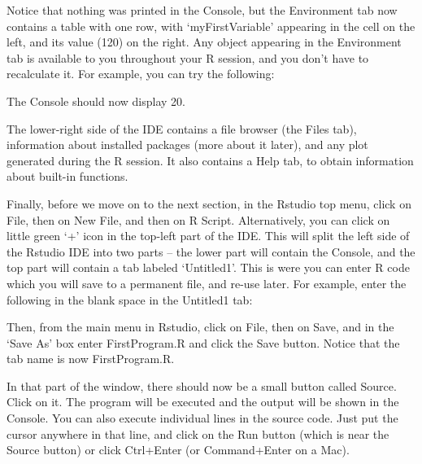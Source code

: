 Notice that nothing was printed in the Console, but the Environment tab now contains a table with one row, with `myFirstVariable' appearing in the cell on the left, and its value (120) on the right. Any object appearing in the Environment tab is available to you throughout your R session, and you don't have to recalculate it. For example, you can try the following:

\begin{Shaded}
\begin{Highlighting}[]
\SpecialCharTok{/}
\end{Highlighting}
\end{Shaded}

The Console should now display 20.

The lower-right side of the IDE contains a file browser (the Files tab), information about installed packages (more about it later), and any plot generated during the R session. It also contains a Help tab, to obtain information about built-in functions.

Finally, before we move on to the next section, in the Rstudio top menu, click on File, then on New File, and then on R Script. Alternatively, you can click on little green `+' icon in the top-left part of the IDE. This will split the left side of the Rstudio IDE into two parts -- the lower part will contain the Console, and the top part will contain a tab labeled `Untitled1'. This is were you can enter R code which you will save to a permanent file, and re-use later.
For example, enter the following in the blank space in the Untitled1 tab:

\begin{Shaded}
\begin{Highlighting}[]
\NormalTok{(}\StringTok{\textquotesingle{}}\NormalTok{)}
\end{Highlighting}
\end{Shaded}

Then, from the main menu in Rstudio, click on File, then on Save, and in the `Save As' box enter FirstProgram.R and click the Save button.
Notice that the tab name is now FirstProgram.R.

In that part of the window, there should now be a small button called Source. Click on it. The program will be executed and the output will be shown in the Console. You can also execute individual lines in the source code. Just put the cursor anywhere in that line, and click on the Run button (which is near the Source button) or click Ctrl+Enter (or Command+Enter on a Mac). 

